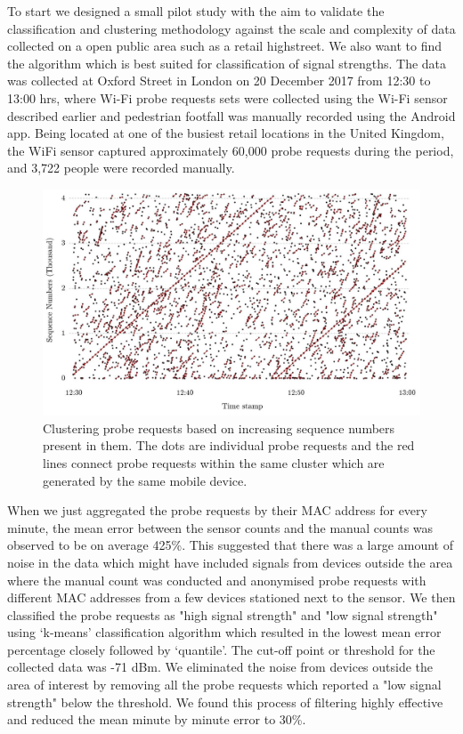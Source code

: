 To start we designed a small pilot study with the aim to validate the classification and clustering methodology against the scale and complexity of data collected on a open public area such as a retail highstreet.
We also want to find the algorithm which is best suited for classification of signal strengths.
The data was collected at Oxford Street in London on 20 December 2017 from 12:30 to 13:00 hrs, where Wi-Fi probe requests sets were collected using the Wi-Fi sensor described earlier and pedestrian footfall was manually recorded using the Android app.
Being located at one of the busiest retail locations in the United Kingdom, the WiFi sensor captured approximately 60,000 probe requests during the period, and 3,722 people were recorded manually.

\begin{figure}
	\begin{center}
		\includegraphics [width=0.95\linewidth] {images/pilot_clustering.jpeg}
		\caption{Clustering probe requests based on increasing sequence numbers present in them. The dots are individual probe requests and the red lines connect probe requests within the same cluster which are generated by the same mobile device.}
		\label{pilot_clustering}
	\end{center}
\end{figure}

When we just aggregated the probe requests by their MAC address for every minute, the mean error between the sensor counts and the manual counts was observed to be on average 425\%.
This suggested that there was a large amount of noise in the data which might have included signals from devices outside the area where the manual count was conducted and anonymised probe requests with different MAC addresses from a few devices stationed next to the sensor.
We then classified the probe requests as "high signal strength" and "low signal strength" using `k-means' classification algorithm which resulted in the lowest mean error percentage closely followed by `quantile'.
The cut-off point or threshold for the collected data was -71 dBm.
We eliminated the noise from devices outside the area of interest by removing all the probe requests which reported a "low signal strength" below the threshold.
We found this process of filtering highly effective and reduced the mean minute by minute error to 30\%.

